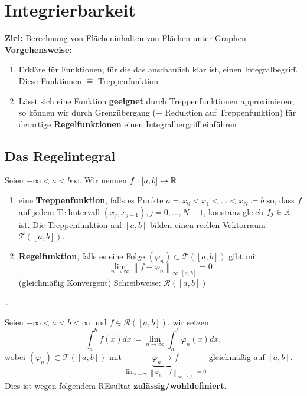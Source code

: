 \section{Integrierbarkeit}
\textbf{Ziel:} Berechnung von Flächeninhalten von Flächen unter Graphen\\
\textbf{Vorgehensweise:}
\begin{enumerate}[label=(\roman*)]
	\item Erkläre für Funktionen, für die das anschaulich klar ist, einen Integralbegriff. Diese Funktionen $ \hat{=}  $ Treppenfunktion
	\item Lässt sich eine Funktion \textbf{geeignet} durch Treppenfunktionen approximieren, so können wir durch Grenzübergang (+ Reduktion auf Treppenfunktion) für derartige \textbf{Regelfunktionen} einen Integralbergriff einführen
\end{enumerate}

\subsection{Das Regelintegral}
\begin{subdefinition}
	Seien $ -\infty < a < b \infty $. Wir nennen $ f: [a, b] \to \mathbb{R}  $ 
	\begin{enumerate}[label=(\roman*)]
		\item eine \textbf{Treppenfunktion}, falls es Punkte $ a \eqqcolon x_0 < x_1 < \dotsc < x_N \coloneqq b $ so, dass $ f $ auf jedem Teilintervall $ (x_j, x_{j+1} ), j = 0, \dotsc, N -1 $, konstanz gleich $ f_j \in \mathbb{R}  $ ist. Die Treppenfunktion auf $ [a, b] $ bilden einen reellen Vektorraum $ \mathcal{T} \left( [a, b] \right)  $.
		\item \textbf{Regelfunktion}, falls es eine Folge $ \left( \varphi_n \right) \subset \mathcal{T} \left( [a, b] \right)  $ gibt mit 
			\[
				\lim_{n \to \infty} \left\| f - \varphi_n \right\|_{\infty, [a, b]} = 0
			\]
			(gleichmäßig Konvergent) Schreibweise: $ \mathcal{R} \left( [a, b] \right)  $
	\end{enumerate}
	
\end{subdefinition}

\begin{subexample}
	\ldots
\end{subexample}

\begin{subdefinition}
	Seien $ -\infty< a < b < \infty $ und $ f \in \mathcal{R} \left( [a, b] \right)  $. wir setzen
	\[
		\int_{a}^{b} f(x) dx \coloneqq \lim_{n \to \infty} \int_{a}^{b}\varphi_n(x) dx,
	\]
	wobei $ \left( \varphi_n \right) \subset \mathcal{T} \left( [a, b] \right)  $ mit $ \underbrace{\varphi_n \to f}_{\lim_{n \to \infty} \left\| \varphi_n - f \right\|_{\infty, [a, b]} = 0 } $ gleichmäßig auf $ [a, b] $.\\
	Dies ist wegen folgendem REsultat \textbf{zulässig/wohldefiniert}.
\end{subdefinition}

